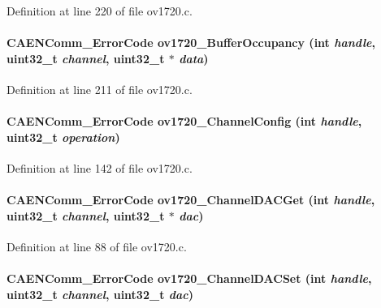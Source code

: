 Definition at line 220 of file ov1720.c.
\paragraph[{ov1720\_\-BufferOccupancy}]{\setlength{\rightskip}{0pt plus 5cm}CAENComm\_\-ErrorCode ov1720\_\-BufferOccupancy (int {\em handle}, \/  uint32\_\-t {\em channel}, \/  uint32\_\-t $\ast$ {\em data})}\hfill\label{ov1720_8c_adb987e7cb8af28956e30acfe6f15df15}


Definition at line 211 of file ov1720.c.
\paragraph[{ov1720\_\-ChannelConfig}]{\setlength{\rightskip}{0pt plus 5cm}CAENComm\_\-ErrorCode ov1720\_\-ChannelConfig (int {\em handle}, \/  uint32\_\-t {\em operation})}\hfill\label{ov1720_8c_ae92af290a5ff93f84ac31298c9c6fc60}


Definition at line 142 of file ov1720.c.
\paragraph[{ov1720\_\-ChannelDACGet}]{\setlength{\rightskip}{0pt plus 5cm}CAENComm\_\-ErrorCode ov1720\_\-ChannelDACGet (int {\em handle}, \/  uint32\_\-t {\em channel}, \/  uint32\_\-t $\ast$ {\em dac})}\hfill\label{ov1720_8c_a7603f3480c25130fdf3341c539f736cf}


Definition at line 88 of file ov1720.c.
\paragraph[{ov1720\_\-ChannelDACSet}]{\setlength{\rightskip}{0pt plus 5cm}CAENComm\_\-ErrorCode ov1720\_\-ChannelDACSet (int {\em handle}, \/  uint32\_\-t {\em channel}, \/  uint32\_\-t {\em dac})}\hfill\label{ov1720_8c_ac1054ea39de55b9c40022120737f338d}


